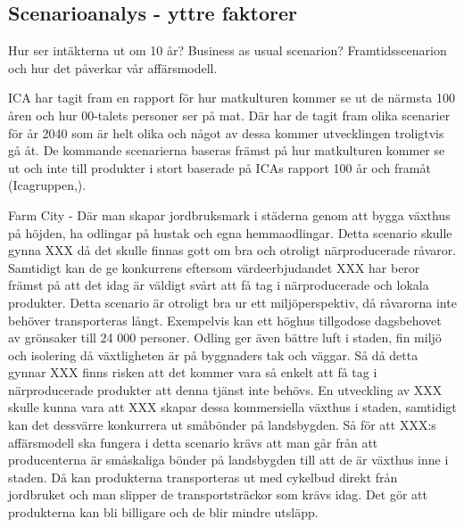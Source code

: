 \documentclass[10pt,a4paper,oneside]{article}
\begin{document}
\subsection{Scenarioanalys  - yttre faktorer}
Hur ser intäkterna ut om 10 år?
Business as usual scenarion?
Framtidsscenarion och hur det påverkar vår affärsmodell. 

ICA har tagit fram en rapport för hur matkulturen kommer se ut de närmsta 100 åren och hur 00-talets personer ser på mat. Där har de tagit fram olika scenarier för år 2040 som är helt olika och något av dessa kommer utvecklingen troligtvis gå åt. De kommande scenarierna baseras främst på hur matkulturen kommer se ut och inte till produkter i stort baserade på ICAs rapport 100 år och framåt (Icagruppen,). 

Farm City - Där man skapar jordbruksmark i städerna genom att bygga växthus på höjden, ha odlingar på hustak och egna hemmaodlingar. Detta scenario skulle gynna XXX då det skulle finnas gott om bra och otroligt närproducerade råvaror. Samtidigt kan de ge konkurrens eftersom värdeerbjudandet XXX har beror främst på att det idag är väldigt svårt att få tag i närproducerade och lokala produkter. Detta scenario är otroligt bra ur ett miljöperspektiv, då råvarorna inte behöver transporteras långt. Exempelvis kan ett höghus tillgodose dagsbehovet av grönsaker till 24 000 personer. Odling ger även bättre luft i staden, fin miljö och isolering då växtligheten är på byggnaders tak och väggar. Så då detta gynnar XXX finns risken att det kommer vara så enkelt att få tag i närproducerade produkter att denna tjänst inte behövs. En utveckling av XXX skulle kunna vara att XXX skapar dessa kommersiella växthus i staden, samtidigt kan det dessvärre konkurrera ut småbönder på landsbygden. Så för att XXX:s affärsmodell ska fungera i detta scenario krävs att man går från att producenterna är småskaliga bönder på landsbygden till att de är växthus inne i staden. Då kan produkterna transporteras ut med cykelbud direkt från jordbruket och man slipper de transportsträckor som krävs idag. Det gör att produkterna kan bli billigare och de blir mindre utsläpp. 
\end{document}
